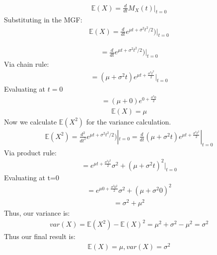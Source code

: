 \documentclass{article}
\begin{document}
\begin{align*}
\mathbb{E}(X)=\frac{d}{dt}M_X(t) |_{t=0}
\end{align*}
Substituting in the MGF:
\begin{align*}
\mathbb{E}(X)=\frac{d}{dt}e^{\mu t + \sigma^2t^2/2}) |_{t=0}
\end{align*}

\begin{align*}
=\frac{d}{dt}e^{\mu t + \sigma^2t^2/2}) |_{t=0}
\end{align*}
Via chain rule:
\begin{align*}
=(\mu+\sigma^2 t) e^{\mu t + \frac{\sigma^2 t^2}{2}} |_{t=0}
\end{align*}
Evaluating at $t=0$
\begin{align*}
=(\mu+0) e^{0 + \frac{\sigma^2 0}{2}}
\end{align*}
\begin{align*}
\mathbb{E}(X) = \mu
\end{align*}
Now we calculate $\mathbb{E}(X^2)$ for the variance calculation.
\begin{align*}
\mathbb{E}(X^2) = \frac{d^2}{dt^2}e^{\mu t + \sigma^2t^2/2}) |_{t=0} = \frac{d}{dt}(\mu+\sigma^2 t) e^{\mu t + \frac{\sigma^2 t^2}{2}} |_{t=0}
\end{align*}
Via product rule:
\begin{align*}
 = e^{\mu t + \frac{\sigma^2 t^2}{2}} \sigma^2 + (\mu+\sigma^2 t)^2  |_{t=0}
\end{align*}
Evaluating at t=0
\begin{align*}
 = e^{\mu 0 + \frac{\sigma^2 0^2}{2}} \sigma^2 + (\mu+\sigma^2 0)^2
\end{align*}
\begin{align*}
 = \sigma^2+\mu^2
\end{align*}
Thus, our variance is:
\begin{align*}
var(X) = \mathbb{E}(X^2) - \mathbb{E}(X)^2 = \mu^2+\sigma^2-\mu^2=\sigma^2
\end{align*}
Thus our final result is:
\begin{align*}
\boxed{ \mathbb{E}(X)= \mu, var(X) = \sigma^2 }
\end{align*}
\end{document}
